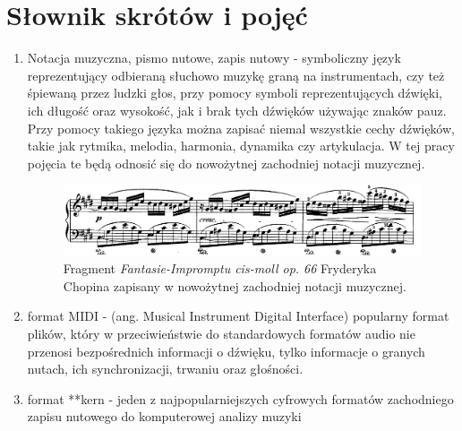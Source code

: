 \section{Słownik skrótów i pojęć}
	
\begin{enumerate}
	\item Notacja muzyczna, pismo nutowe, zapis nutowy - symboliczny język reprezentujący odbieraną słuchowo muzykę graną na instrumentach, czy też śpiewaną przez ludzki głos, przy pomocy symboli reprezentujących dźwięki, ich długość oraz wysokość, jak i brak tych dźwięków używając znaków pauz. Przy pomocy takiego języka można zapisać niemal wszystkie cechy dźwięków, takie jak rytmika, melodia, harmonia, dynamika czy artykulacja. W tej pracy pojęcia te będą odnosić się do nowożytnej zachodniej notacji muzycznej.
	
	\begin{figure}
		\centering
		\includegraphics[width=14cm]{images/chopin_fastasie_impromtu_no_4_op_66.png}
		\caption{Fragment \textit{Fantasie-Impromptu cis-moll op. 66} Fryderyka Chopina zapisany w nowożytnej zachodniej notacji muzycznej. }
		\label{fig:chopin_impromptu}
	\end{figure}
	
	\item format MIDI - (ang. Musical Instrument Digital Interface) popularny format plików, który w przeciwieństwie do standardowych formatów audio nie przenosi bezpośrednich informacji o dźwięku, tylko informacje o granych nutach, ich synchronizacji, trwaniu oraz głośności.
	
	\item format **kern - jeden z najpopularniejszych cyfrowych formatów zachodniego zapisu nutowego do komputerowej analizy muzyki
\end{enumerate}
	